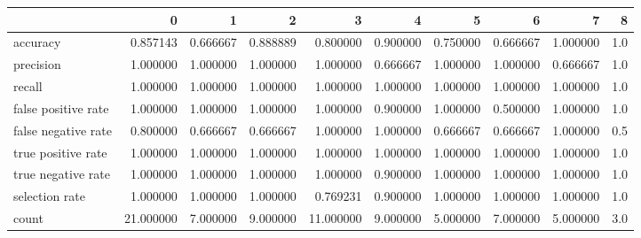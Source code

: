 \begin{tabular}{lrrrrrrrrr}
\toprule
{} &          0 &         1 &         2 &          3 &         4 &         5 &         6 &         7 &    8 \\
\midrule
accuracy            &   0.857143 &  0.666667 &  0.888889 &   0.800000 &  0.900000 &  0.750000 &  0.666667 &  1.000000 &  1.0 \\
precision           &   1.000000 &  1.000000 &  1.000000 &   1.000000 &  0.666667 &  1.000000 &  1.000000 &  0.666667 &  1.0 \\
recall              &   1.000000 &  1.000000 &  1.000000 &   1.000000 &  1.000000 &  1.000000 &  1.000000 &  1.000000 &  1.0 \\
false positive rate &   1.000000 &  1.000000 &  1.000000 &   1.000000 &  0.900000 &  1.000000 &  0.500000 &  1.000000 &  1.0 \\
false negative rate &   0.800000 &  0.666667 &  0.666667 &   1.000000 &  1.000000 &  0.666667 &  0.666667 &  1.000000 &  0.5 \\
true positive rate  &   1.000000 &  1.000000 &  1.000000 &   1.000000 &  1.000000 &  1.000000 &  1.000000 &  1.000000 &  1.0 \\
true negative rate  &   1.000000 &  1.000000 &  1.000000 &   1.000000 &  0.900000 &  1.000000 &  1.000000 &  1.000000 &  1.0 \\
selection rate      &   1.000000 &  1.000000 &  1.000000 &   0.769231 &  0.900000 &  1.000000 &  1.000000 &  1.000000 &  1.0 \\
count               &  21.000000 &  7.000000 &  9.000000 &  11.000000 &  9.000000 &  5.000000 &  7.000000 &  5.000000 &  3.0 \\
\bottomrule
\end{tabular}
